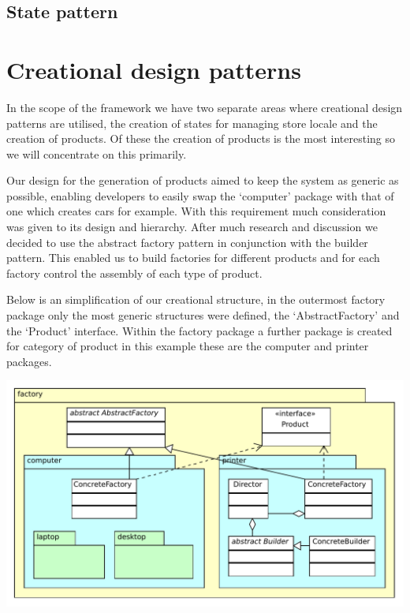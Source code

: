 \documentclass[pdftex,11pt,a4paper]{article}
\begin{document}
\subsection{State pattern}
\pagebreak

\section{Creational design patterns}
In the scope of the framework we have two separate areas where creational design patterns are utilised, the creation of states for managing store locale and the creation of products. Of these the creation of products is the most interesting so we will concentrate on this primarily.

Our design for the generation of products aimed to keep the system as generic as possible, enabling developers to easily swap the ‘computer’ package with that of one which creates cars for example. With this requirement much consideration was given to its design and hierarchy. After much research and discussion we decided to use the abstract factory pattern in conjunction with the builder pattern. This enabled us to build factories for different products and for each factory control the assembly of each type of product.

Below is an simplification of our creational structure, in the outermost factory package only the most generic structures were defined, the ‘AbstractFactory’ and the ‘Product’ interface. Within the factory package a further package is created for category of product in this example these are the computer and printer packages.

\begin{center}
	\includegraphics[scale=0.75]{images/creational_diagram.pdf}
\end{center}
\end{document}
